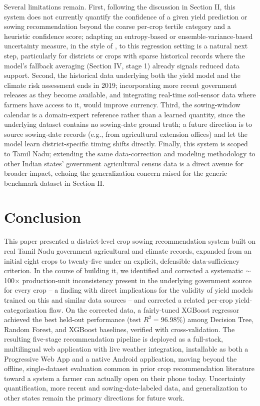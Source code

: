 \documentclass[conference]{IEEEtran}
\begin{document}
Several limitations remain. First, following the discussion in Section II, this
system does not currently quantify the confidence of a given yield prediction or
sowing recommendation beyond the coarse per-crop tertile category and a heuristic
confidence score; adapting an entropy-based or ensemble-variance-based uncertainty
measure, in the style of \cite{alam2025}, to this regression setting is a natural next
step, particularly for districts or crops with sparse historical records where the
model's fallback averaging (Section IV, stage 1) already signals reduced data
support. Second, the historical data underlying both the yield model and the climate
risk assessment ends in 2019; incorporating more recent government releases as they
become available, and integrating real-time soil-sensor data where farmers have
access to it, would improve currency. Third, the sowing-window calendar is a
domain-expert reference rather than a learned quantity, since the underlying dataset
contains no sowing-date ground truth; a future direction is to source sowing-date
records (e.g., from agricultural extension offices) and let the model learn
district-specific timing shifts directly. Finally, this system is scoped to Tamil
Nadu; extending the same data-correction and modeling methodology to other Indian
states' government agricultural census data is a direct avenue for broader impact,
echoing the generalization concern raised for the generic benchmark dataset in
Section II.

\section{Conclusion}

This paper presented a district-level crop sowing recommendation system built on real
Tamil Nadu government agricultural and climate records, expanded from an initial eight
crops to twenty-five under an explicit, defensible data-sufficiency criterion. In the
course of building it, we identified and corrected a systematic $\sim$100$\times$
production-unit inconsistency present in the underlying government source for every
crop -- a finding with direct implications for the validity of yield models trained on
this and similar data sources -- and corrected a related per-crop yield-categorization
flaw. On the corrected data, a fairly-tuned XGBoost regressor achieved the best
held-out performance (test $R^2 = 96.98\%$) among Decision Tree, Random Forest, and
XGBoost baselines, verified with cross-validation. The resulting five-stage
recommendation pipeline is deployed as a full-stack, multilingual web application with
live weather integration, installable as both a Progressive Web App and a native
Android application, moving beyond the offline, single-dataset evaluation common in
prior crop recommendation literature toward a system a farmer can actually open on
their phone today. Uncertainty quantification, more recent and sowing-date-labeled
data, and generalization to other states remain the primary directions for future
work.
\end{document}
